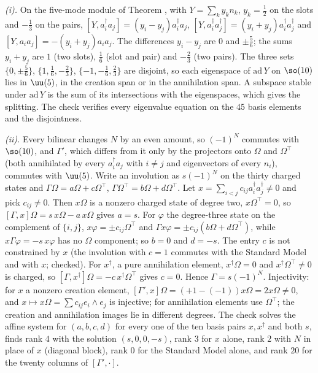 \emph{(i).} On the five-mode module of Theorem , with $Y = \sum_{k} y_{k} n_{k}$, $y_{k} = \tfrac12$ on the slots and $-\tfrac13$ on the pairs, $[Y, a^{\dagger}_{i}a_{j}] = (y_{i} - y_{j})a^{\dagger}_{i}a_{j}$, $[Y, a^{\dagger}_{i}a^{\dagger}_{j}] = (y_{i} + y_{j})a^{\dagger}_{i}a^{\dagger}_{j}$ and $[Y, a_{i}a_{j}] = -(y_{i} + y_{j})a_{i}a_{j}$. The differences $y_{i} - y_{j}$ are $0$ and $\pm\tfrac56$; the sums $y_{i} + y_{j}$ are $1$ (two slots), $\tfrac16$ (slot and pair) and $-\tfrac23$ (two pairs). The three sets $\{0, \pm\tfrac56\}$, $\{1, \tfrac16, -\tfrac23\}$, $\{-1, -\tfrac16, \tfrac23\}$ are disjoint, so each eigenspace of $\mathrm{ad}\,Y$ on $\so(10)$ lies in $\uu(5)$, in the creation span or in the annihilation span. A subspace stable under $\mathrm{ad}\,Y$ is the sum of its intersections with the eigenspaces, which gives the splitting. The check verifies every eigenvalue equation on the $45$ basis elements and the disjointness.

\emph{(ii).} Every bilinear changes $N$ by an even amount, so $(-1)^{N}$ commutes with $\so(10)$, and $\Gamma'$, which differs from it only by the projectors onto $\Omega$ and $\Omega^{\top}$ (both annihilated by every $a^{\dagger}_{i}a_{j}$ with $i \ne j$ and eigenvectors of every $n_{i}$), commutes with $\uu(5)$. Write an involution as $s(-1)^{N}$ on the thirty charged states and $\Gamma\Omega = a\Omega + c\Omega^{\top}$, $\Gamma\Omega^{\top} = b\Omega + d\Omega^{\top}$. Let $x = \sum_{i<j} c_{ij}a^{\dagger}_{i}a^{\dagger}_{j} \ne 0$ and pick $c_{ij} \ne 0$. Then $x\Omega$ is a nonzero charged state of degree two, $x\Omega^{\top} = 0$, so $[\Gamma, x]\Omega = s\,x\Omega - a\,x\Omega$ gives $a = s$. For $\varphi$ the degree-three state on the complement of $\{i, j\}$, $x\varphi = \pm c_{ij}\Omega^{\top}$ and $\Gamma x\varphi = \pm c_{ij}(b\Omega + d\Omega^{\top})$, while $x\Gamma\varphi = -s\,x\varphi$ has no $\Omega$ component; so $b = 0$ and $d = -s$. The entry $c$ is not constrained by $x$ (the involution with $c = 1$ commutes with the Standard Model and with $x$; checked). For $x^{\dagger}$, a pure annihilation element, $x^{\dagger}\Omega = 0$ and $x^{\dagger}\Omega^{\top} \ne 0$ is charged, so $[\Gamma, x^{\dagger}]\Omega = -c\,x^{\dagger}\Omega^{\top}$ gives $c = 0$. Hence $\Gamma = s(-1)^{N}$. Injectivity: for $x$ a nonzero creation element, $[\Gamma', x]\Omega = (+1 - (-1))x\Omega = 2x\Omega \ne 0$, and $x \mapsto x\Omega = \sum c_{ij}e_{i} \wedge e_{j}$ is injective; for annihilation elements use $\Omega^{\top}$; the creation and annihilation images lie in different degrees. The check solves the affine system for $(a, b, c, d)$ for every one of the ten basis pairs $x, x^{\dagger}$ and both $s$, finds rank $4$ with the solution $(s, 0, 0, -s)$, rank $3$ for $x$ alone, rank $2$ with $N$ in place of $x$ (diagonal block), rank $0$ for the Standard Model alone, and rank $20$ for the twenty columns of $[\Gamma', \cdot]$.

